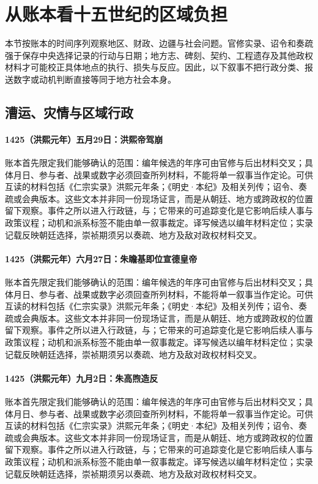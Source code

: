 \section{从账本看十五世纪的区域负担}

本节按账本的时间序列观察地区、财政、边疆与社会问题。官修实录、诏令和奏疏强于保存中央选择记录的行动与日期；地方志、碑刻、契约、工程遗存及其他政权材料才可能校正具体地点的执行、损失与反应。因此，以下叙事不把行政分类、报送数字或动机判断直接等同于地方社会本身。

\subsection{漕运、灾情与区域行政}

\paragraph{1425（洪熙元年）五月29日：洪熙帝驾崩} 账本首先限定我们能够确认的范围：编年候选的年序可由官修与后出材料交叉；具体月日、参与者、战果或数字必须回查所列材料，不能将单一叙事当作定论。可供互读的材料包括《仁宗实录》洪熙元年条；《明史·本纪》及相关列传；诏令、奏疏或会典版本。这些文本并非同一份现场证言，而是从朝廷、地方或跨政权的位置留下观察。事件之所以进入行政链，与；它带来的可追踪变化是它影响后续人事与政策议程；动机和派系标签不能由单一叙事裁定。译写候选以编年材料定位；实录记载反映朝廷选择，崇祯期须另以奏疏、地方及敌对政权材料交叉。

\paragraph{1425（洪熙元年）六月27日：朱瞻基即位宣德皇帝} 账本首先限定我们能够确认的范围：编年候选的年序可由官修与后出材料交叉；具体月日、参与者、战果或数字必须回查所列材料，不能将单一叙事当作定论。可供互读的材料包括《仁宗实录》洪熙元年条；《明史·本纪》及相关列传；诏令、奏疏或会典版本。这些文本并非同一份现场证言，而是从朝廷、地方或跨政权的位置留下观察。事件之所以进入行政链，与；它带来的可追踪变化是它影响后续人事与政策议程；动机和派系标签不能由单一叙事裁定。译写候选以编年材料定位；实录记载反映朝廷选择，崇祯期须另以奏疏、地方及敌对政权材料交叉。

\paragraph{1425（洪熙元年）九月2日：朱高煦造反} 账本首先限定我们能够确认的范围：编年候选的年序可由官修与后出材料交叉；具体月日、参与者、战果或数字必须回查所列材料，不能将单一叙事当作定论。可供互读的材料包括《仁宗实录》洪熙元年条；《明史·本纪》及相关列传；诏令、奏疏或会典版本。这些文本并非同一份现场证言，而是从朝廷、地方或跨政权的位置留下观察。事件之所以进入行政链，与；它带来的可追踪变化是它影响后续人事与政策议程；动机和派系标签不能由单一叙事裁定。译写候选以编年材料定位；实录记载反映朝廷选择，崇祯期须另以奏疏、地方及敌对政权材料交叉。

